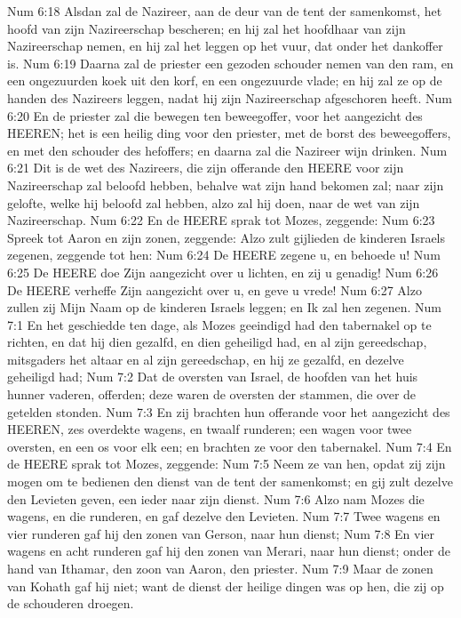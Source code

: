 Num 6:18  Alsdan zal de Nazireer, aan de deur van de tent der samenkomst, het hoofd van zijn Nazireerschap bescheren; en hij zal het hoofdhaar van zijn Nazireerschap nemen, en hij zal het leggen op het vuur, dat onder het dankoffer is.
Num 6:19  Daarna zal de priester een gezoden schouder nemen van den ram, en een ongezuurden koek uit den korf, en een ongezuurde vlade; en hij zal ze op de handen des Nazireers leggen, nadat hij zijn Nazireerschap afgeschoren heeft.
Num 6:20  En de priester zal die bewegen ten beweegoffer, voor het aangezicht des HEEREN; het is een heilig ding voor den priester, met de borst des beweegoffers, en met den schouder des hefoffers; en daarna zal die Nazireer wijn drinken.
Num 6:21  Dit is de wet des Nazireers, die zijn offerande den HEERE voor zijn Nazireerschap zal beloofd hebben, behalve wat zijn hand bekomen zal; naar zijn gelofte, welke hij beloofd zal hebben, alzo zal hij doen, naar de wet van zijn Nazireerschap.
Num 6:22  En de HEERE sprak tot Mozes, zeggende:
Num 6:23  Spreek tot Aaron en zijn zonen, zeggende: Alzo zult gijlieden de kinderen Israels zegenen, zeggende tot hen:
Num 6:24  De HEERE zegene u, en behoede u!
Num 6:25  De HEERE doe Zijn aangezicht over u lichten, en zij u genadig!
Num 6:26  De HEERE verheffe Zijn aangezicht over u, en geve u vrede!
Num 6:27  Alzo zullen zij Mijn Naam op de kinderen Israels leggen; en Ik zal hen zegenen.
Num 7:1  En het geschiedde ten dage, als Mozes geeindigd had den tabernakel op te richten, en dat hij dien gezalfd, en dien geheiligd had, en al zijn gereedschap, mitsgaders het altaar en al zijn gereedschap, en hij ze gezalfd, en dezelve geheiligd had;
Num 7:2  Dat de oversten van Israel, de hoofden van het huis hunner vaderen, offerden; deze waren de oversten der stammen, die over de getelden stonden.
Num 7:3  En zij brachten hun offerande voor het aangezicht des HEEREN, zes overdekte wagens, en twaalf runderen; een wagen voor twee oversten, en een os voor elk een; en brachten ze voor den tabernakel.
Num 7:4  En de HEERE sprak tot Mozes, zeggende:
Num 7:5  Neem ze van hen, opdat zij zijn mogen om te bedienen den dienst van de tent der samenkomst; en gij zult dezelve den Levieten geven, een ieder naar zijn dienst.
Num 7:6  Alzo nam Mozes die wagens, en die runderen, en gaf dezelve den Levieten.
Num 7:7  Twee wagens en vier runderen gaf hij den zonen van Gerson, naar hun dienst;
Num 7:8  En vier wagens en acht runderen gaf hij den zonen van Merari, naar hun dienst; onder de hand van Ithamar, den zoon van Aaron, den priester.
Num 7:9  Maar de zonen van Kohath gaf hij niet; want de dienst der heilige dingen was op hen, die zij op de schouderen droegen.
